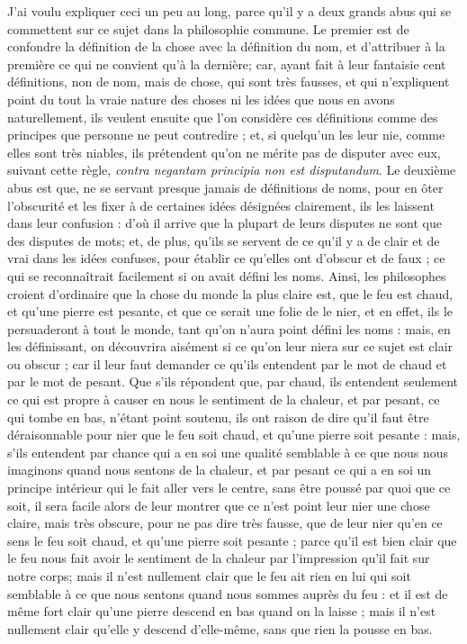 J'ai voulu expliquer ceci un peu au long, parce qu'il y a deux grands abus qui se commettent sur ce sujet dans la philosophie commune. Le premier est de confondre la définition de la chose avec la définition du nom, et d'attribuer à la première ce qui ne convient qu'à la dernière; car, ayant fait à leur fantaisie cent définitions, non de nom, mais de chose, qui sont très fausses, et qui n'expliquent point du tout la vraie nature des choses ni les idées que nous en avons naturellement, ils veulent ensuite que l'on considère ces définitions comme des principes que personne ne peut contredire ; et, si quelqu'un les leur nie, comme elles sont très niables, ils prétendent qu'on ne mérite pas de disputer avec eux, suivant cette règle, \emph{contra negantam principia non est disputandum}. Le deuxième abus est que, ne se servant presque jamais de définitions de noms, pour en ôter l'obscurité et les fixer à de certaines idées désignées clairement, ils les laissent dans leur confusion : d'où il arrive que la plupart de leurs disputes ne sont que des disputes de mots; et, de plus, qu'ils se servent de ce qu'il y a de clair et de vrai dans les idées confuses, pour établir ce qu'elles ont d'obscur et de faux ; ce qui se reconnaîtrait facilement si on avait défini les noms. Ainsi, les philosophes croient d'ordinaire que la chose du monde la plus claire est, que le feu est chaud, et qu'une pierre est pesante, et que ce serait une folie de le nier, et en effet, ils le persuaderont à tout le monde, tant qu'on n'aura point défini les noms : mais, en les définissant, on découvrira aisément si ce qu'on leur niera sur ce sujet est clair ou obscur ; car il leur faut demander ce qu'ils entendent par le mot de chaud et par le mot de pesant. Que s'ils répondent que, par chaud, ils entendent seulement ce qui est propre à causer en nous le sentiment de la chaleur, et par pesant, ce qui tombe en bas, n'étant point soutenu, ils ont raison de dire qu'il faut être déraisonnable pour nier que le feu soit chaud, et qu'une pierre soit pesante : mais, s'ils entendent par chance qui a en soi une qualité semblable à ce que nous nous imaginons quand nous sentons de la chaleur, et par pesant ce qui a en soi un principe intérieur qui le fait aller vers le centre, sans être poussé par quoi que ce soit, il sera facile alors de leur montrer que ce n'est point leur nier une chose claire, mais très obscure, pour ne pas dire très fausse, que de leur nier qu'en ce sens le feu soit chaud, et qu'une pierre soit pesante ; parce qu'il est bien clair que le feu nous fait avoir le sentiment de la chaleur par l'impression qu'il fait sur notre corps; mais il n'est nullement clair que le feu ait rien en lui qui soit semblable à ce que nous sentons quand nous sommes auprès du feu : et il est de même fort clair qu'une pierre descend en bas quand on la laisse ; mais il n'est nullement clair qu'elle y descend d'elle-même, sans que rien la pousse en bas.

